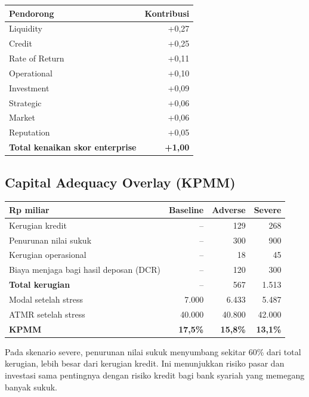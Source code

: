 \documentclass[11pt,a4paper]{article}
\begin{document}
\begin{center}
\begin{tabular}{lr}
\toprule
\textbf{Pendorong} & \textbf{Kontribusi}\\
\midrule
Liquidity & +0{,}27\\
Credit & +0{,}25\\
Rate of Return & +0{,}11\\
Operational & +0{,}10\\
Investment & +0{,}09\\
Strategic & +0{,}06\\
Market & +0{,}06\\
Reputation & +0{,}05\\
\midrule
\textbf{Total kenaikan skor enterprise} & \textbf{+1{,}00}\\
\bottomrule
\end{tabular}
\end{center}

\subsection{Capital Adequacy Overlay (KPMM)}

\begin{center}
\begin{tabular}{lrrr}
\toprule
\textbf{Rp miliar} & \textbf{Baseline} & \textbf{Adverse} & \textbf{Severe}\\
\midrule
Kerugian kredit & -- & 129 & 268\\
Penurunan nilai sukuk & -- & 300 & 900\\
Kerugian operasional & -- & 18 & 45\\
Biaya menjaga bagi hasil deposan (DCR) & -- & 120 & 300\\
\textbf{Total kerugian} & -- & 567 & 1.513\\
Modal setelah stress & 7.000 & 6.433 & 5.487\\
ATMR setelah stress & 40.000 & 40.800 & 42.000\\
\midrule
\textbf{KPMM} & \textbf{17{,}5\%} & \textbf{15{,}8\%} & \textbf{13{,}1\%}\\
\bottomrule
\end{tabular}
\end{center}

\begin{tipbox}
Pada skenario severe, penurunan nilai sukuk menyumbang sekitar 60\% dari total kerugian, lebih besar dari kerugian kredit. Ini menunjukkan risiko pasar dan investasi sama pentingnya dengan risiko kredit bagi bank syariah yang memegang banyak sukuk.
\end{tipbox}
\end{document}
